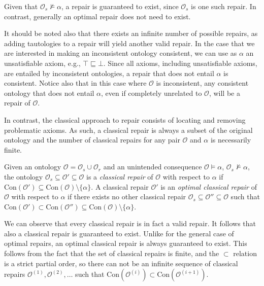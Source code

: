Given that $\mathcal{O}_s \not\vDash \alpha$, a repair is guaranteed to exist, since $\mathcal{O}_s$ is one such repair. In contrast, generally an optimal repair does not need to exist.

\begin{example}
\end{example}

It should be noted also that there exists an infinite number of possible repairs, as adding tautologies to a repair will yield another valid repair. In the case that we are interested in making an inconsistent ontology consistent, we can use as $\alpha$ an unsatisfiable axiom, e.g., $\top \sqsubseteq \bot$. Since all axioms, including unsatisfiable axioms, are entailed by inconsistent ontologies, a repair that does not entail $\alpha$ is consistent. Notice also that in this case where $\mathcal{O}$ is inconsistent, any consistent ontology that does not entail $\alpha$, even if completely unrelated to $\mathcal{O}$, will be a repair of $\mathcal{O}$.

In contrast, the classical approach to repair consists of locating and removing problematic axioms. As such, a classical repair is always a subset of the original ontology and the number of classical repairs for any pair $\mathcal{O}$ and $\alpha$ is necessarily finite.

\begin{definition}
Given an ontology $\mathcal{O} = \mathcal{O}_s \cup \mathcal{O}_r$ and an unintended consequence $\mathcal{O} \vDash \alpha$, $\mathcal{O}_s \not\vDash \alpha$, the ontology $\mathcal{O}_s \subseteq \mathcal{O}' \subseteq \mathcal{O}$ is a \emph{classical repair} of $\mathcal{O}$ with respect to $\alpha$ if $\mathrm{Con}(\mathcal{O}') \subseteq \mathrm{Con}(\mathcal{O}) \setminus \{\alpha\}.$ A classical repair $\mathcal{O}'$ is an \emph{optimal classical repair} of $\mathcal{O}$ with respect to $\alpha$ if there exists no other classical repair $\mathcal{O}_s \subseteq \mathcal{O}'' \subseteq \mathcal{O}$ such that $\mathrm{Con}(\mathcal{O}') \subset \mathrm{Con}(\mathcal{O}'') \subseteq \mathrm{Con}(\mathcal{O}) \setminus \{\alpha\}$.
\end{definition}

We can observe that every classical repair is in fact a valid repair. It follows that also a classical repair is guaranteed to exist. Unlike for the general case of optimal repairs, an optimal classical repair is always guaranteed to exist. This follows from the fact that the set of classical repairs is finite, and the $\subset$ relation is a strict partial order, so there can not be an infinite sequence of classical repairs $\mathcal{O}^{(1)}, \mathcal{O}^{(2)}, \dots$  such that $\mathrm{Con}(\mathcal{O}^{(i)}) \subset \mathrm{Con}(\mathcal{O}^{(i + 1)})$.

